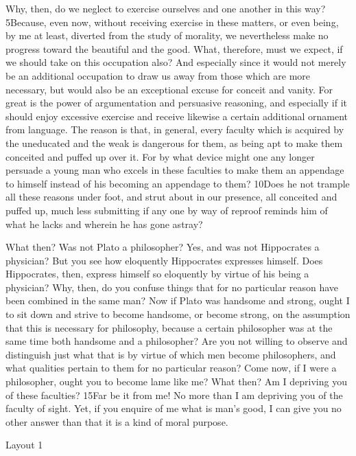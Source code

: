 Why, then, do we neglect to exercise ourselves and one another in this way? 5Because, even now, without receiving exercise in these matters, or even being, by me at least, diverted from the study of morality, we nevertheless make no progress toward the beautiful and the good. What, therefore, must we expect, if we should take on this occupation also? And especially since it would not merely be an additional occupation to draw us away from those which are more necessary, but would also be an exceptional excuse for conceit and vanity. For great is the power of argumentation and persuasive reasoning, and especially if it should enjoy excessive exercise and receive likewise a certain additional ornament from language. The reason is that, in general, every faculty which is acquired by the uneducated and the weak is dangerous for them, as being apt to make them conceited and puffed up over it. For by what device might one any longer persuade a young man who excels in these faculties to make them an appendage to himself instead of his becoming an appendage to them? 10Does he not trample all these reasons under foot, and strut about in our presence, all conceited and puffed up, much less submitting if any one by way of reproof reminds him of what he lacks and wherein he has gone astray?

What then? Was not Plato a philosopher? Yes, and was not Hippocrates a physician? But you see how eloquently Hippocrates expresses himself. Does Hippocrates, then, express himself so eloquently by virtue of his being a physician? Why, then, do you confuse things that for no particular reason have been combined in the same man? Now if Plato was handsome and strong, ought I to sit down and strive to become handsome, or become strong, on the assumption that this is necessary for philosophy, because a certain philosopher was at the same time both handsome and a philosopher? Are you not willing to observe and distinguish just what that is by virtue of which men become philosophers, and what qualities pertain to them for no particular reason? Come now, if I were a philosopher, ought you to become lame like me? What then? Am I depriving you of these faculties? 15Far be it from me! No more than I am depriving you of the faculty of sight. Yet, if you enquire of me what is man's good, I can give you no other answer than that it is a kind of moral purpose.



Layout 1

